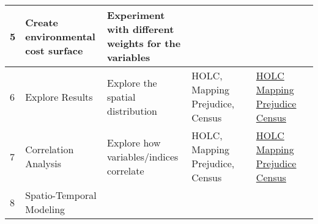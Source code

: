 \documentclass[article,12pt]{article}
\numberwithin{equation}{section}
\begin{document}
{\begin{tabular}{|l|p{.2\linewidth}|p{.2\linewidth}|p{.2\linewidth}|p{.1\linewidth}|p{.1\linewidth}|p{.1\linewidth}|}
		5 & Create environmental cost surface & Experiment with different weights for the variables                &                                         &                                                   &                                                                                                                                                                                                         &             \\ \hline
		6 & Explore Results                       & Explore the spatial distribution                       & HOLC, Mapping Prejudice, Census         &                                                   & \href{https://gisdata.mn.gov/dataset/us-mn-state-metc-plan-historic-holc-appraisal}{HOLC} \newline  \href{https://mappingprejudice.umn.edu/racial-covenants/maps-data}{Mapping Prejudice} \newline \href{https://data2.nhgis.org/main}{Census} &            
		\\ \hline
		7 & Correlation Analysis                       & Explore how variables/indices correlate                        & HOLC, Mapping Prejudice, Census         &                                                   & \href{https://gisdata.mn.gov/dataset/us-mn-state-metc-plan-historic-holc-appraisal}{HOLC} \newline  \href{https://mappingprejudice.umn.edu/racial-covenants/maps-data}{Mapping Prejudice} \newline \href{https://data2.nhgis.org/main}{Census} &              \\ \hline
		8 & Spatio-Temporal Modeling                   &                                                                &                                         &                                                   &                                                                                                                                                                                                         &       \\ \hline     
	\end{tabular}
}
\end{document}
